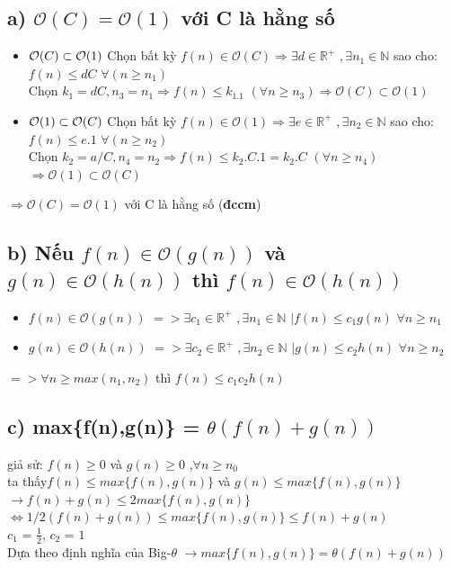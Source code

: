 \documentclass[10pt,a4paper]{article}
\begin{document}
\subsection*{a) $\mathcal{O}(C) = \mathcal{O}(1)$ với C là hằng số}
\begin{itemize}
    \item $\mathcal{O}(C) \subset \mathcal{O}(1)\\$
    Chọn bất kỳ $f(n) \in \mathcal{O}(C) \Rightarrow \exists d \in \mathbb{R^+}$ $,\exists n_1 \in \mathbb{N}$ sao cho: $f(n) \leq dC$ $\forall(n \geq n_1)$ \\
    Chọn $k_1 = dC, n_3 = n_1 \Rightarrow f(n) \leq k_1.1$ $ (\forall n \geq n_3)$$\Rightarrow \mathcal{O}(C) \subset \mathcal{O}(1)$
     \item $\mathcal{O}(1) \subset \mathcal{O}(C)\\$
     Chọn bất kỳ $f(n) \in \mathcal{O}(1) \Rightarrow \exists e \in \mathbb{R^+}$ $,\exists n_2 \in \mathbb{N}$ sao cho: $f(n) \leq e.1$ $\forall(n \geq n_2)$ \\
    Chọn $k_2 = a/C, n_4 = n_2 \Rightarrow f(n) \leq k_2.C.1=k_2.C$ $ (\forall n \geq n_4)$$ \Rightarrow \mathcal{O}(1) \subset \mathcal{O}(C)$
\end{itemize}
$\Rightarrow \mathcal{O}(C) = \mathcal{O}(1)$ với C là hằng số (\textbf{đccm})
\subsection*{b) Nếu $f(n) \in \mathcal{O}(g(n))$ và $g(n) \in \mathcal{O}(h(n))$ thì $f(n) \in \mathcal{O}(h(n))$}
\begin{itemize}
    \item $f(n) \in \mathcal{O}(g(n))$ $=> \exists c_1 \in \mathbb{R^+}$ $,\exists n_1 \in \mathbb{N}$ $| f(n) \leq c_1g(n)$ $\forall n \geq n_1$
    \item $g(n) \in \mathcal{O}(h(n))$ $=> \exists c_2 \in \mathbb{R^+}$ $,\exists n_2 \in \mathbb{N}$ $| g(n) \leq c_2h(n)$ $\forall n \geq n_2$
\end{itemize}
$=> \forall n \geq max(n_1,n_2)$ thì $f(n) \leq c_1c_2h(n)$ \\
\subsection*{c) max\{f(n),g(n)\} = $\theta(f(n)+g(n))$}
giả sử: $f(n)\geq0$ và $g(n)\geq0$
,$\forall n \geq n_0$\\
ta thấy$ f(n) \leq max\{f(n),g(n)\} $ và $ g(n) \leq max\{f(n),g(n)\}  $\\
$\rightarrow f(n) + g(n) \leq 2max\{f(n),g(n)\}$\\
$\Leftrightarrow 1/2(f(n)+g(n))\leq max\{f(n),g(n)\} \leq f(n)+g(n)$\\
$c_1$ = $\frac{1}{2}$, $c_2$ = $1$\\
Dựa theo định nghĩa của Big-$\theta$
$\rightarrow max\{f(n),g(n)\} = \theta(f(n)+g(n))$\\
\end{document}
